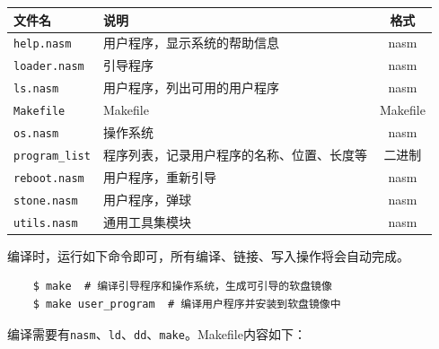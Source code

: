 \documentclass[adobefonts, a4paper]{ctexart}
\begin{document}
\begin{tabular}{|l|l|c|}
\hline
文件名&说明&格式\\ \hline
\verb|help.nasm|&用户程序，显示系统的帮助信息&nasm\\ \hline
\verb|loader.nasm|&引导程序&nasm\\ \hline
\verb|ls.nasm|&用户程序，列出可用的用户程序&nasm\\ \hline
\verb|Makefile|&Makefile&Makefile\\ \hline
\verb|os.nasm|&操作系统&nasm\\ \hline
\verb|program_list|&程序列表，记录用户程序的名称、位置、长度等&二进制\\ \hline
\verb|reboot.nasm|&用户程序，重新引导&nasm\\ \hline
\verb|stone.nasm|&用户程序，弹球&nasm\\ \hline
\verb|utils.nasm|&通用工具集模块&nasm\\ \hline
\end{tabular}

\vspace{\baselineskip}

编译时，运行如下命令即可，所有编译、链接、写入操作将会自动完成。
\begin{verbatim}
    $ make  # 编译引导程序和操作系统，生成可引导的软盘镜像
    $ make user_program  # 编译用户程序并安装到软盘镜像中
\end{verbatim}

编译需要有\verb|nasm|、\verb|ld|、\verb|dd|、\verb|make|。Makefile内容如下：
\end{document}

